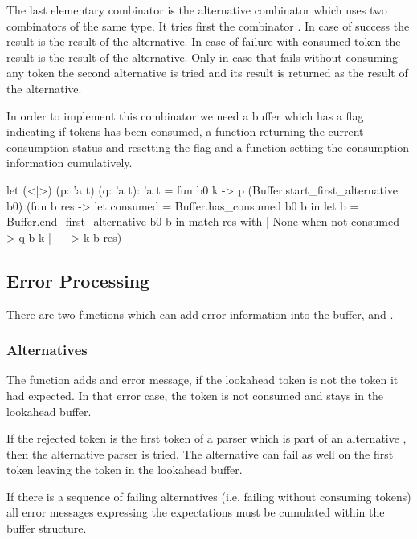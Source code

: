 The last elementary combinator is the alternative combinator 
which uses two combinators of the same type.
It tries first the combinator . In case of success the result is the
result of the alternative. In case of failure with consumed token the result
is the result of the alternative. Only in case that  fails without
consuming any token the second alternative is tried and its result is returned
as the result of the alternative.

In order to implement this combinator we need a buffer which has a flag
indicating if tokens has been consumed, a function returning the current
consumption status and resetting the flag and a function setting the
consumption information cumulatively.

\begin{ocaml}
  let (<|>) (p: 'a t) (q: 'a t): 'a t =
    fun b0 k ->
      p (Buffer.start_first_alternative b0)
        (fun b res ->
           let consumed = Buffer.has_consumed b0 b in
           let b = Buffer.end_first_alternative b0 b in
           match res with
           | None when not consumed ->
               q b k
           | _ ->
               k b res)
\end{ocaml}




\subsection{Error Processing}

There are two functions which can add error information into the buffer,
 and .


\subsubsection{Alternatives}


The function  adds and error message, if the lookahead token is
not the token it had expected. In that error case, the token is not consumed
and stays in the lookahead buffer.

If the rejected token is the first token of a parser  which is part of
an alternative , then the alternative parser  is
tried. The alternative can fail as well on the first token leaving the token
in the lookahead buffer.

If there is a sequence of failing alternatives (i.e. failing without consuming
tokens) all error messages expressing the expectations must be cumulated
within the buffer structure.

